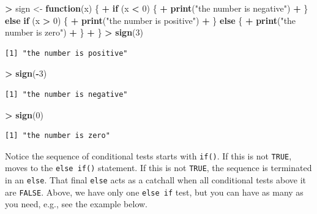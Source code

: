 \documentclass[]{krantz}
\makeatletter
\newenvironment{Shaded}{\begin{snugshade}}{\end{snugshade}}
\newcommand{\ControlFlowTok}[1]{\textcolor[rgb]{0.27,0.27,0.27}{\textbf{#1}}}
\newcommand{\DecValTok}[1]{\textcolor[rgb]{0.06,0.06,0.06}{#1}}
\newcommand{\KeywordTok}[1]{\textcolor[rgb]{0.27,0.27,0.27}{\textbf{#1}}}
\newcommand{\NormalTok}[1]{#1}
\newcommand{\OperatorTok}[1]{\textcolor[rgb]{0.43,0.43,0.43}{\textbf{#1}}}
\newcommand{\StringTok}[1]{\textcolor[rgb]{0.5,0.5,0.5}{#1}}
\newenvironment{kframe}{%
\medskip{}
\setlength{\fboxsep}{.8em}
 \def\at@end@of@kframe{}%
 \ifinner\ifhmode%
  \def\at@end@of@kframe{\end{minipage}}%
  \begin{minipage}{\columnwidth}%
 \fi\fi%
 \def\FrameCommand##1{\hskip\@totalleftmargin \hskip-\fboxsep
 \colorbox{shadecolor}{##1}\hskip-\fboxsep
     \hskip-\linewidth \hskip-\@totalleftmargin \hskip\columnwidth}%
 \MakeFramed {\advance\hsize-\width
   \@totalleftmargin\z@ \linewidth\hsize
   \@setminipage}}%
 {\par\unskip\endMakeFramed%
 \at@end@of@kframe}
\renewenvironment{Shaded}{\begin{kframe}}{\end{kframe}}
\makeatother
\begin{document}
\begin{Shaded}
\begin{Highlighting}[]
\OperatorTok{>}\StringTok{ }\NormalTok{sign <-}\StringTok{ }\ControlFlowTok{function}\NormalTok{(x) \{}
\OperatorTok{+}\StringTok{   }\ControlFlowTok{if}\NormalTok{ (x }\OperatorTok{<}\StringTok{ }\DecValTok{0}\NormalTok{) \{}
\OperatorTok{+}\StringTok{     }\KeywordTok{print}\NormalTok{(}\StringTok{"the number is negative"}\NormalTok{)}
\OperatorTok{+}\StringTok{   }\NormalTok{\} }\ControlFlowTok{else} \ControlFlowTok{if}\NormalTok{ (x }\OperatorTok{>}\StringTok{ }\DecValTok{0}\NormalTok{) \{}
\OperatorTok{+}\StringTok{     }\KeywordTok{print}\NormalTok{(}\StringTok{"the number is positive"}\NormalTok{)}
\OperatorTok{+}\StringTok{   }\NormalTok{\} }\ControlFlowTok{else}\NormalTok{ \{}
\OperatorTok{+}\StringTok{     }\KeywordTok{print}\NormalTok{(}\StringTok{"the number is zero"}\NormalTok{)}
\OperatorTok{+}\StringTok{   }\NormalTok{\}}
\OperatorTok{+}\StringTok{ }\NormalTok{\}}
\OperatorTok{>}\StringTok{ }\KeywordTok{sign}\NormalTok{(}\DecValTok{3}\NormalTok{)}
\end{Highlighting}
\end{Shaded}

\begin{verbatim}
[1] "the number is positive"
\end{verbatim}

\begin{Shaded}
\begin{Highlighting}[]
\OperatorTok{>}\StringTok{ }\KeywordTok{sign}\NormalTok{(}\OperatorTok{-}\DecValTok{3}\NormalTok{)}
\end{Highlighting}
\end{Shaded}

\begin{verbatim}
[1] "the number is negative"
\end{verbatim}

\begin{Shaded}
\begin{Highlighting}[]
\OperatorTok{>}\StringTok{ }\KeywordTok{sign}\NormalTok{(}\DecValTok{0}\NormalTok{)}
\end{Highlighting}
\end{Shaded}

\begin{verbatim}
[1] "the number is zero"
\end{verbatim}

Notice the sequence of conditional tests starts with \texttt{if()}. If this is not \texttt{TRUE}, moves to the \texttt{else\ if()} statement. If this is not \texttt{TRUE}, the sequence is terminated in an \texttt{else}. That final \texttt{else} acts as a catchall when all conditional tests above it are \texttt{FALSE}. Above, we have only one \texttt{else\ if} test, but you can have as many as you need, e.g., see the example below.
\end{document}
